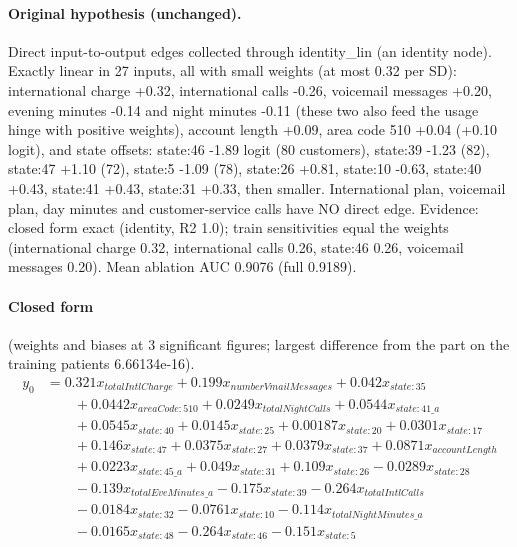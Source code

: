 \documentclass[a4paper,10pt]{article}
\newif\ifreviewmarks
\newcommand{\reviewrule}{\noindent{\color{BrickRed}\rule{\linewidth}{0.8pt}}}
\newenvironment{drafted}[1][]{%
  \ifreviewmarks\par\addvspace{\medskipamount}\reviewrule\par\nopagebreak
  \noindent{\color{BrickRed}\sffamily\footnotesize\textbf{Thesis Draft}\quad #1\hfill review}\par\nopagebreak\smallskip\fi}{%
  \ifreviewmarks\par\smallskip\noindent{\color{BrickRed}\sffamily\footnotesize end of thesis draft}\par\nopagebreak\reviewrule\par\medskip\fi}
\begin{document}
\begin{drafted}[plain-language layer: churn100-s7-c1]
\paragraph{Original hypothesis (unchanged).} Direct input-to-output edges collected through identity\_\allowbreak{}lin (an identity node). Exactly linear in 27 inputs, all with small weights (at most 0.32 per SD): international charge +0.32, international calls -0.26, voicemail messages +0.20, evening minutes -0.14 and night minutes -0.11 (these two also feed the usage hinge with positive weights), account length +0.09, area code 510 +0.04 (+0.10 logit), and state offsets: state:46 -1.89 logit (80 customers), state:39 -1.23 (82), state:47 +1.10 (72), state:5 -1.09 (78), state:26 +0.81, state:10 -0.63, state:40 +0.43, state:41 +0.43, state:31 +0.33, then smaller. International plan, voicemail plan, day minutes and customer-service calls have NO direct edge. Evidence: closed form exact (identity, R2 1.0); train sensitivities equal the weights (international charge 0.32, international calls 0.26, state:46 0.26, voicemail messages 0.20). Mean ablation AUC 0.9076 (full 0.9189).
\paragraph{Closed form} {\footnotesize(weights and biases at 3 significant figures; largest difference from the part on the training patients 6.66134e-16).}
{\small\begingroup\allowdisplaybreaks
\begin{align*}
y_{0} &= 0.321 x_{totalIntlCharge} + 0.199 x_{numberVmailMessages} + 0.042 x_{state:35} \\
&\qquad + 0.0442 x_{areaCode:510} + 0.0249 x_{totalNightCalls} + 0.0544 x_{state:41\_a} \\
&\qquad + 0.0545 x_{state:40} + 0.0145 x_{state:25} + 0.00187 x_{state:20} + 0.0301 x_{state:17} \\
&\qquad + 0.146 x_{state:47} + 0.0375 x_{state:27} + 0.0379 x_{state:37} + 0.0871 x_{accountLength} \\
&\qquad + 0.0223 x_{state:45\_a} + 0.049 x_{state:31} + 0.109 x_{state:26} - 0.0289 x_{state:28} \\
&\qquad - 0.139 x_{totalEveMinutes\_a} - 0.175 x_{state:39} - 0.264 x_{totalIntlCalls} \\
&\qquad - 0.0184 x_{state:32} - 0.0761 x_{state:10} - 0.114 x_{totalNightMinutes\_a} \\
&\qquad - 0.0165 x_{state:48} - 0.264 x_{state:46} - 0.151 x_{state:5}
\end{align*}\endgroup}


\end{drafted}
\end{document}
